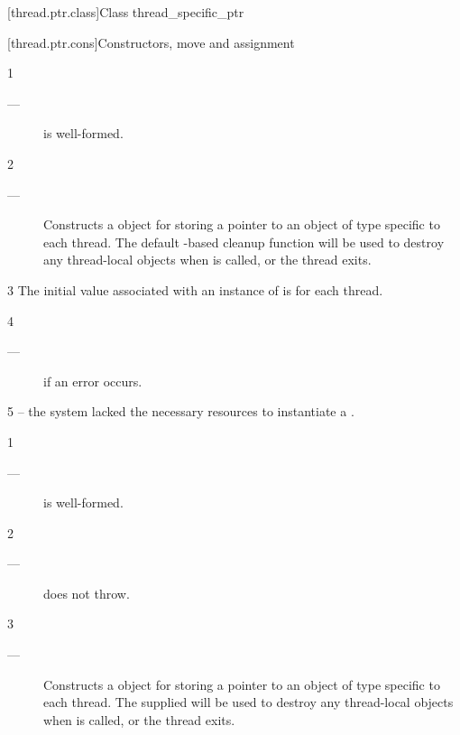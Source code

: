 \documentclass[fontsize=10pt,paper=A4,pagesize,DIV=15]{scrartcl}
\begin{document}
[thread.ptr.class]{Class thread\_specific\_ptr}


[thread.ptr.cons]{Constructors, move and assignment}


1 \mandates
\begin{description}
    \item[---]  is well-formed.
\end{description}

2 \effects
\begin{description}
    \item[---] Constructs a  object for storing a
               pointer to an object of type  specific to each thread.
               The default -based cleanup function will be used to
               destroy any thread-local objects when  is called,
               or the thread exits.
\end{description}

3 \remarks
The initial value associated with an instance of \tptr is  for
each thread.

4 \except
\begin{description}
    \item[---]  if an error occurs.
\end{description}

5 \errors
{} -- the system lacked the necessary
resources to instantiate a \tptr.


1 \mandates
\begin{description}
    \item[---]  is well-formed.
\end{description}

2 \requires
\begin{description}
    \item[---]  does not throw. 
\end{description}

3 \effects
\begin{description}
    \item[---] Constructs a \tptr object for storing a pointer to an object of
               type  specific to each thread. The supplied
                will be used to destroy any
               thread-local objects when  is called, or the
               thread exits.
\end{description}
\end{document}

